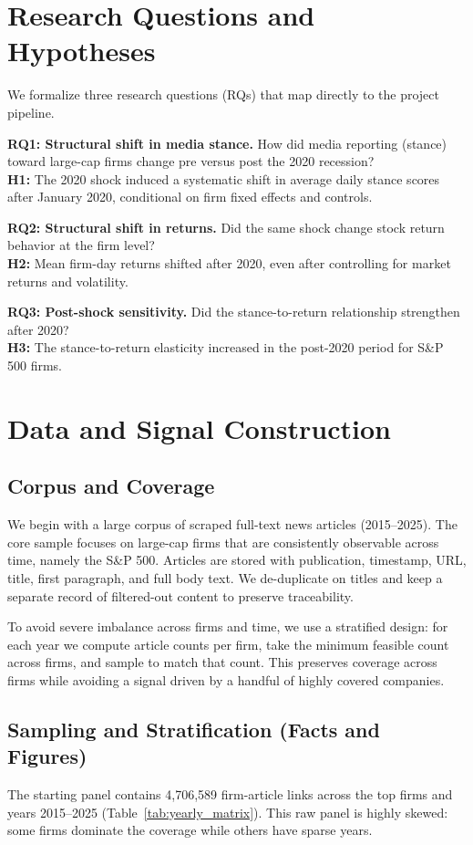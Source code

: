 \documentclass[conference]{IEEEtran}
\begin{document}
\section{Research Questions and Hypotheses}
We formalize three research questions (RQs) that map directly to the project pipeline.

\textbf{RQ1: Structural shift in media stance.} How did media reporting (stance) toward large-cap firms change pre versus post the 2020 recession? \\
\textbf{H1:} The 2020 shock induced a systematic shift in average daily stance scores after January 2020, conditional on firm fixed effects and controls.

\textbf{RQ2: Structural shift in returns.} Did the same shock change stock return behavior at the firm level? \\
\textbf{H2:} Mean firm-day returns shifted after 2020, even after controlling for market returns and volatility.

\textbf{RQ3: Post-shock sensitivity.} Did the stance-to-return relationship strengthen after 2020? \\
\textbf{H3:} The stance-to-return elasticity increased in the post-2020 period for S\&P 500 firms.

\section{Data and Signal Construction}
\subsection{Corpus and Coverage}
We begin with a large corpus of scraped full-text news articles (2015--2025). The core sample focuses on large-cap firms that are consistently observable across time, namely the S\&P 500. Articles are stored with publication, timestamp, URL, title, first paragraph, and full body text. We de-duplicate on titles and keep a separate record of filtered-out content to preserve traceability.

To avoid severe imbalance across firms and time, we use a stratified design: for each year we compute article counts per firm, take the minimum feasible count across firms, and sample to match that count. This preserves coverage across firms while avoiding a signal driven by a handful of highly covered companies.

\subsection{Sampling and Stratification (Facts and Figures)}
The starting panel contains 4,706,589 firm-article links across the top firms and years 2015--2025 (Table~\ref{tab:yearly_matrix}). This raw panel is highly skewed: some firms dominate the coverage while others have sparse years.
\end{document}
